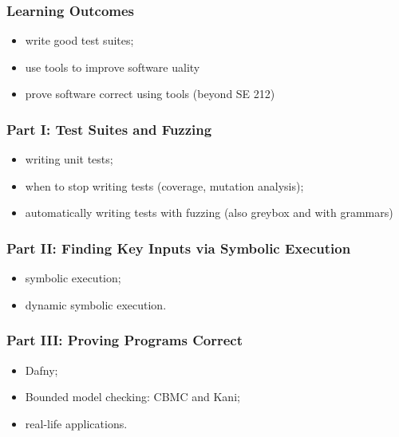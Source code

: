 \documentclass{beamer}
\newenvironment{changemargin}[1]{%
  \begin{list}{}{%
    \setlength{\topsep}{0pt}%
    \setlength{\leftmargin}{#1}%
    \setlength{\rightmargin}{1em}
    \setlength{\listparindent}{\parindent}%
    \setlength{\itemindent}{\parindent}%
    \setlength{\parsep}{\parskip}%
  }%
  \item[]}{\end{list}}
\begin{document}
\begin{frame}
  \frametitle{Learning Outcomes}

  \Large
  \begin{changemargin}{2em}
    \begin{itemize}
    \item write good test suites;
    \item use tools to improve software uality
      \item prove software correct using tools (beyond SE 212)
        \end{itemize}
  \end{changemargin}
\end{frame}


\begin{frame}
\frametitle{Part I: Test Suites and Fuzzing}
\begin{changemargin}{2em}
\Large
\begin{itemize}
\item writing unit tests;
\item when to stop writing tests (coverage, mutation analysis);
\item automatically writing tests with fuzzing (also greybox and with grammars)
\end{itemize}
\end{changemargin}
\end{frame}

\begin{frame}
\frametitle{Part II: Finding Key Inputs via Symbolic Execution}
\begin{changemargin}{2em}
\Large
\begin{itemize}
\item symbolic execution;
\item dynamic symbolic execution.
\end{itemize}
\end{changemargin}
\end{frame}

\begin{frame}
\frametitle{Part III: Proving Programs Correct}
\begin{changemargin}{2em}
\Large
\begin{itemize}
\item Dafny;
\item Bounded model checking: CBMC and Kani;
\item real-life applications.
\end{itemize}
\end{changemargin}
\end{frame}
\end{document}
